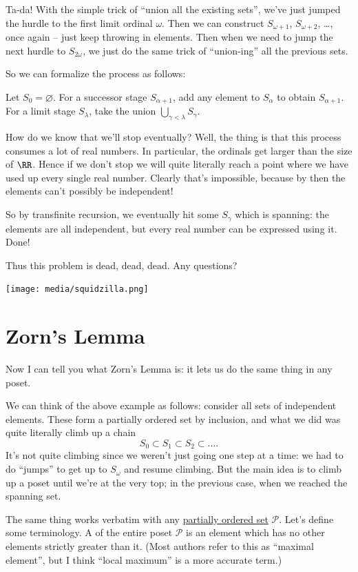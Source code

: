 Ta-da!
With the simple trick of ``union all the existing sets'',
we've just jumped the hurdle to the first limit ordinal $\omega$.
Then we can construct $S_{\omega+1}$, $S_{\omega+2}$, \dots, once again --
just keep throwing in elements.
Then when we need to jump the next hurdle to $S_{2 \omega}$,
we just do the same trick of ``union-ing'' all the previous sets.

So we can formalize the process as follows:
\begin{enumerate}
	\ii Let $S_0 = \varnothing$.
	\ii For a successor stage $S_{\alpha+1}$, add any element to $S_\alpha$ to obtain $S_{\alpha+1}$.
	\ii For a limit stage $S_{\lambda}$, take the union $\bigcup_{\gamma < \lambda} S_\gamma$.
\end{enumerate}
How do we know that we'll stop eventually?
Well, the thing is that this process consumes a lot of real numbers.
In particular, the ordinals get larger than the size of $\RR$.
Hence if we don't stop we will quite literally reach a point where we have used up every single real number.
Clearly that's impossible, because by then the elements can't possibly be independent!

So by transfinite recursion, we eventually hit some $S_\gamma$ which is spanning:
the elements are all independent, but every real number can be expressed using it.  Done!


Thus this problem is dead, dead, dead. Any questions?
\begin{center}
	\texttt{[image: media/squidzilla.png]}
\end{center}


\section{Zorn's Lemma}
Now I can tell you what Zorn's Lemma is:
it lets us do the same thing in any poset.

We can think of the above example as follows:
consider all sets of independent elements.
These form a partially ordered set by inclusion, and what we did
was quite literally climb up a chain
\[ S_0 \subset S_1 \subset S_2 \subset \dots. \]
It's not quite climbing since we weren't just going one step at a time:
we had to do ``jumps'' to get up to $S_\omega$ and resume climbing.
But the main idea is to climb up a poset until we're at the very top;
in the previous case, when we reached the spanning set.

The same thing works verbatim with any \href{http://en.wikipedia.org/wiki/Partially_ordered_set}{partially ordered set}
$\mathcal P$.
Let's define some terminology.
A  of the entire poset $\mathcal P$ is an element
which has no other elements strictly greater than it.
(Most authors refer to this as ``maximal element'', but I think
``local maximum'' is a more accurate term.)

